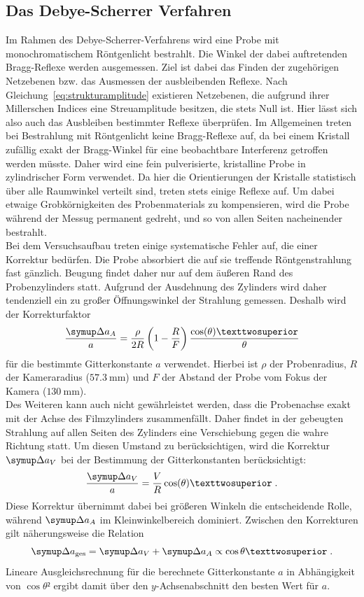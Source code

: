 \subsection{Das Debye-Scherrer Verfahren}
%
Im Rahmen des Debye-Scherrer-Verfahrens wird eine Probe mit monochromatischem Röntgenlicht bestrahlt. Die Winkel der dabei auftretenden
Bragg-Reflexe werden ausgemessen. Ziel ist dabei das Finden der zugehörigen Netzebenen bzw. das Ausmessen der ausbleibenden Reflexe. Nach
Gleichung~\eqref{eq:strukturamplitude} existieren Netzebenen, die aufgrund ihrer Millerschen Indices eine Streuamplitude besitzen, die
stets Null ist. Hier lässt sich also auch das Ausbleiben bestimmter Reflexe überprüfen. Im Allgemeinen treten bei Bestrahlung mit
Röntgenlicht keine Bragg-Reflexe auf, da bei einem Kristall zufällig exakt der Bragg-Winkel für eine beobachtbare Interferenz getroffen
werden müsste. Daher wird eine fein pulverisierte, kristalline Probe in zylindrischer Form verwendet. Da hier die Orientierungen der
Kristalle statistisch über alle Raumwinkel verteilt sind, treten stets einige Reflexe auf. Um dabei etwaige Grobkörnigkeiten des
Probenmaterials zu kompensieren, wird die Probe während der Messug permanent gedreht, und so von allen Seiten nacheinender bestrahlt.\\
Bei dem Versuchsaufbau treten einige systematische Fehler auf, die einer Korrektur bedürfen. Die Probe absorbiert die auf sie treffende
Röntgenstrahlung fast gänzlich. Beugung findet daher nur auf dem äußeren Rand des Probenzylinders statt. Aufgrund der Ausdehnung des
Zylinders wird daher tendenziell ein zu großer Öffnungswinkel der Strahlung gemessen. Deshalb wird der Korrekturfaktor
%
\begin{equation}
 \frac{\upD a_A}{a}=\frac{\rho}{2R}\left(1-\frac{R}{F}\right)\frac{\cos(\theta)²}{\theta}
\end{equation}
%
für die bestimmte Gitterkonstante $a$ verwendet. Hierbei ist $\rho$ der Probenradius, $R$ der Kameraradius ($\SI{57,3}{\milli\meter}$)
und $F$ der Abstand der Probe vom Fokus der Kamera ($\SI{130}{\milli\meter}$).\\
Des Weiteren kann auch nicht gewährleistet werden, dass die Probenachse exakt mit der Achse des Filmzylinders zusammenfällt. Daher
findet in der gebeugten Strahlung auf allen Seiten des Zylinders eine Verschiebung gegen die wahre Richtung statt. Um diesen
Umstand zu berücksichtigen, wird die Korrektur $\upD a_V$ bei der Bestimmung der Gitterkonstanten berücksichtigt:
%
\begin{equation}
  \frac{\upD a_V}{a}=\frac{V}{R}\cos(\theta)² \; .
\end{equation}
%
Diese Korrektur übernimmt dabei bei größeren Winkeln die entscheidende Rolle, während $\upD a_A$ im Kleinwinkelbereich dominiert.
Zwischen den Korrekturen gilt näherungsweise die Relation
%
\begin{equation}
  \upD a_\text{ges}=\upD a_V+\upD a_A\propto\cos{\theta}² \; .
\end{equation}
%
Lineare Ausgleichsrechnung für die berechnete Gitterkonstante $a$ in Abhängigkeit von $\cos{\theta}²$ ergibt damit über den
$y$-Achsenabschnitt den besten Wert für $a$.
